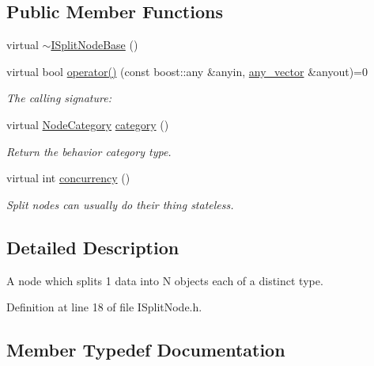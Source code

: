 \subsection*{Public Member Functions}
\begin{DoxyCompactItemize}
\item 
virtual \hyperlink{class_wire_cell_1_1_i_split_node_base_a157aefe658d4a676bbb21ad20f9638dc}{$\sim$\+I\+Split\+Node\+Base} ()
\item 
virtual bool \hyperlink{class_wire_cell_1_1_i_split_node_base_a40983dc11d8835581d0abcd1989cbc44}{operator()} (const boost\+::any \&anyin, \hyperlink{class_wire_cell_1_1_i_split_node_base_af68870ead16af4b29a3b0d486f217fe8}{any\+\_\+vector} \&anyout)=0
\begin{DoxyCompactList}\small\item\em The calling signature\+: \end{DoxyCompactList}\item 
virtual \hyperlink{class_wire_cell_1_1_i_node_a5546e64cbb70bd3ac787295cac9ac803}{Node\+Category} \hyperlink{class_wire_cell_1_1_i_split_node_base_aae628151ca5604b24682381ba267dded}{category} ()
\begin{DoxyCompactList}\small\item\em Return the behavior category type. \end{DoxyCompactList}\item 
virtual int \hyperlink{class_wire_cell_1_1_i_split_node_base_a001e95f0334b6f626049a7d50f6cf55f}{concurrency} ()
\begin{DoxyCompactList}\small\item\em Split nodes can usually do their thing stateless. \end{DoxyCompactList}\end{DoxyCompactItemize}


\subsection{Detailed Description}
A node which splits 1 data into N objects each of a distinct type. 

Definition at line 18 of file I\+Split\+Node.\+h.



\subsection{Member Typedef Documentation}
\mbox{\label{class_wire_cell_1_1_i_split_node_base_af68870ead16af4b29a3b0d486f217fe8}} 
